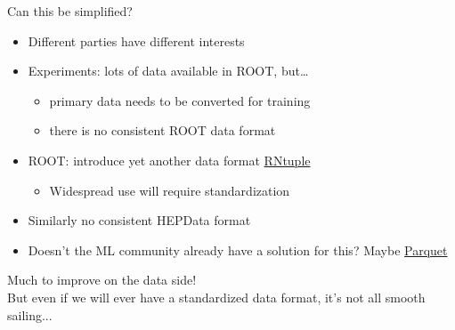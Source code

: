 \documentclass[aspectratio=169,9pt]{beamer}
\begin{document}
\begin{frame}[t]{Can this be simplified?}
  \begin{itemize}
    \item Different parties have different interests
    \item Experiments: lots of data available in ROOT, but\ldots
    \begin{itemize}
      \item primary data needs to be converted for training
      \item there is no consistent ROOT data format
    \end{itemize}
    \item ROOT: introduce yet another data format \href{https://root.cern/doc/master/md_tree_ntuple_v7_doc_README.html}{\color{blue}RNtuple}
    \begin{itemize}
      \item Widespread use will require standardization
    \end{itemize}
    \item Similarly no consistent HEPData format
    \item Doesn't the ML community already have a solution for this? Maybe \href{https://github.com/apache/parquet-format}{\color{blue}Parquet}
  \end{itemize}
  \vspace*{1em}
  Much to improve on the data side!\\\vspace*{1cm}
  But even if we will ever have a standardized data format, it's not all smooth sailing...
\end{frame}
\end{document}

